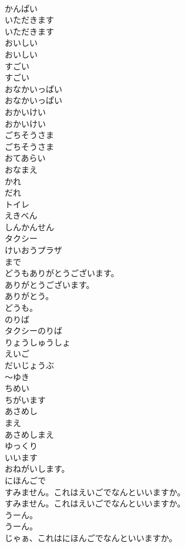 \documentclass[8pt]{extreport}
\begin{document}
\begin{CJK}{UTF8}{min}
\\	かんぱい 
\\	いただきます	
\\	いただきます 
\\	おいしい	
\\	おいしい 
\\	すごい	
\\	すごい 
\\	おなかいっぱい	
\\	おなかいっぱい 
\\	おかいけい	
\\	おかいけい 
\\	ごちそうさま	
\\	ごちそうさま 
\\	おてあらい
\\	おなまえ
\\	かれ
\\	だれ
\\	トイレ
\\	えきべん
\\	しんかんせん
\\	タクシー
\\	けいおうプラザ
\\	まで
\\	どうもありがとうございます。
\\	ありがとうございます。
\\	ありがとう。
\\	どうも。
\\	のりば
\\	タクシーのりば
\\	りょうしゅうしょ
\\	えいご
\\	だいじょうぶ
\\	～ゆき
\\	ちめい
\\	ちがいます
\\	あさめし
\\	まえ
\\	あさめしまえ
\\	ゆっくり
\\	いいます
\\	おねがいします。
\\	にほんごで
\\	すみません。これはえいごでなんといいますか。	
\\	すみません。これはえいごでなんといいますか。 
\\	うーん。	
\\	うーん。 
\\	じゃぁ、これはにほんごでなんといいますか。	

\end{CJK}
\end{document}
